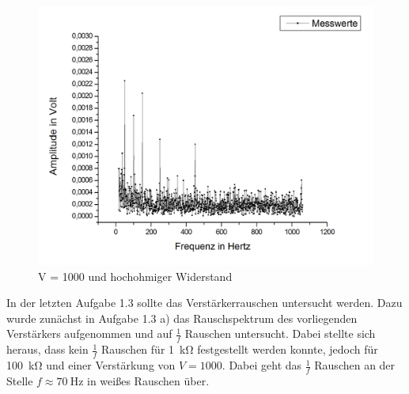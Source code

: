 \documentclass{article}						%
\begin{document}
		\begin{figure}[h!]
			\centering
			\includegraphics[scale=0.4]{Stoerung_mit_Abschirmung}
			\caption{V = 1000 und hochohmiger Widerstand}
		\end{figure}
		
		In der letzten Aufgabe 1.3 sollte das Verstärkerrauschen untersucht werden. Dazu wurde zunächst in Aufgabe 1.3 a) das Rauschspektrum des vorliegenden Verstärkers aufgenommen und auf $ \frac{1}{f} $ Rauschen untersucht. Dabei stellte sich heraus, dass kein $ \frac{1}{f} $ Rauschen für \SI{1}{\kilo\ohm} festgestellt werden konnte, jedoch für \SI{100}{\kilo\ohm} und einer Verstärkung von $ V = 1000 $. Dabei geht das $ \frac{1}{f} $ Rauschen an der Stelle $ f \approx \SI{70}{\hertz} $ in weißes Rauschen über. 
		
\end{document}
